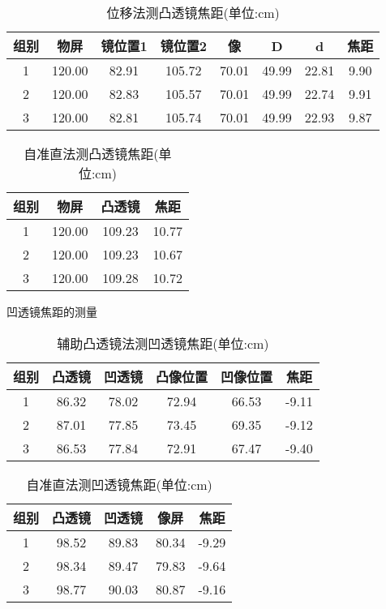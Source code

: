\documentclass[UTF8]{ctexart}
\begin{document}
\begin{table}[H]
\centering
\caption{位移法测凸透镜焦距(单位:cm)}
\begin{tabular}{|c|c|c|c|c|c|c|c|}
\hline
 组别  & 物屏 & 镜位置1 & 镜位置2  &  像  & D & d & 焦距 \\
 \hline
  1   &  120.00 &  82.91 & 105.72 & 70.01 & 49.99 & 22.81 & 9.90 \\
\hline
  2   &  120.00 &  82.83 & 105.57  &  70.01 & 49.99 & 22.74 & 9.91 \\
\hline
  3   &  120.00 &  82.81 & 105.74  &  70.01  & 49.99 & 22.93 & 9.87\\
\hline
\end{tabular}
\end{table}


\begin{table}[H]
\centering
\caption{自准直法测凸透镜焦距(单位:cm)}
\begin{tabular}{|c|c|c|c|}
\hline
 组别  & 物屏 & 凸透镜 &    焦距  \\
 \hline
  1   &  120.00  & 109.23  & 10.77 \\
\hline
  2   &  120.00 & 109.23 & 10.67 \\
\hline
  3   &  120.00 & 109.28 & 10.72 \\
\hline
\end{tabular}
\end{table}

凹透镜焦距的测量

\begin{table}[H]
\centering
\caption{辅助凸透镜法测凹透镜焦距(单位:cm)}
\begin{tabular}{|c|c|c|c|c|c|}
\hline
 组别  & 凸透镜 & 凹透镜 & 凸像位置 &  凹像位置 & 焦距  \\
 \hline
  1   &  86.32 & 78.02 & 72.94 & 66.53 & -9.11 \\
\hline
  2   &  87.01 & 77.85 & 73.45  & 69.35  & -9.12  \\
\hline
  3   & 86.53 & 77.84 & 72.91  & 67.47  & -9.40  \\
\hline
\end{tabular}
\end{table}


\begin{table}[H]
\centering
\caption{自准直法测凹透镜焦距(单位:cm)}
\begin{tabular}{|c|c|c|c|c|}
\hline
 组别  & 凸透镜 & 凹透镜 & 像屏 &  焦距  \\
 \hline
  1   &  98.52 & 89.83  & 80.34  & -9.29  \\
\hline
  2   &  98.34  & 89.47  & 79.83  &  -9.64  \\
\hline
  3   &  98.77 & 90.03 & 80.87 & -9.16 \\
\hline
\end{tabular}
\end{table}
\end{document}
